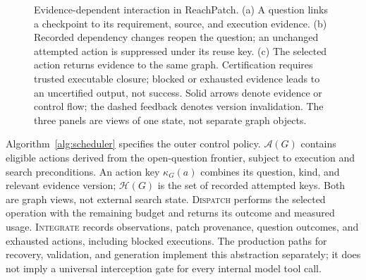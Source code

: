 \documentclass[acmsmall,screen,review,anonymous]{acmart}
\newcommand{\system}{ReachPatch}
\begin{document}
\begin{figure}[t]
\centering

\caption{Evidence-dependent interaction in \system. (a) A question links a checkpoint to its requirement, source, and execution evidence. (b) Recorded dependency changes reopen the question; an unchanged attempted action is suppressed under its reuse key. (c) The selected action returns evidence to the same graph. Certification requires trusted executable closure; blocked or exhausted evidence leads to an uncertified output, not success. Solid arrows denote evidence or control flow; the dashed feedback denotes version invalidation. The three panels are views of one state, not separate graph objects.}
\label{fig:loop}
\end{figure}

Algorithm~\ref{alg:scheduler} specifies the outer control policy. $\mathcal{A}(G)$ contains eligible actions derived from the open-question frontier, subject to execution and search preconditions. An action key $\kappa_G(a)$ combines its question, kind, and relevant evidence version; $\mathcal{H}(G)$ is the set of recorded attempted keys. Both are graph views, not external search state. \textsc{Dispatch} performs the selected operation with the remaining budget and returns its outcome and measured usage. \textsc{Integrate} records observations, patch provenance, question outcomes, and exhausted actions, including blocked executions. The production paths for recovery, validation, and generation implement this abstraction separately; it does not imply a universal interception gate for every internal model tool call.
\end{document}
